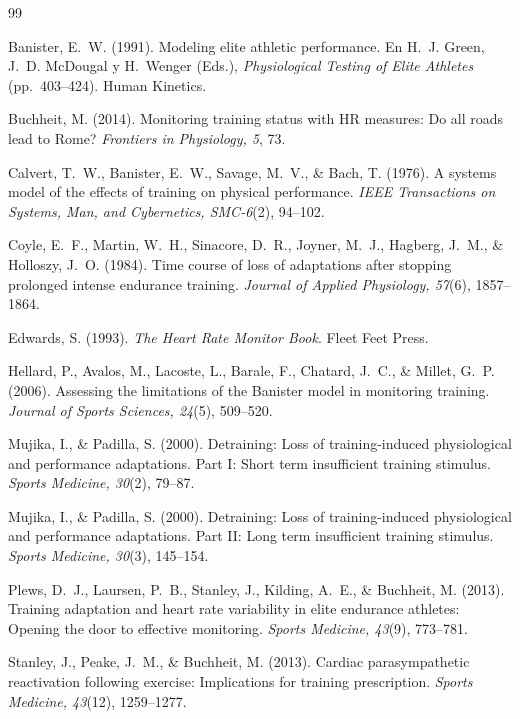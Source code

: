 \documentclass[11pt,a4paper]{article}
\begin{document}
\begin{thebibliography}{99}
\setlength{\itemsep}{2pt}

Banister, E.~W. (1991). Modeling elite athletic performance. En H.~J. Green, J.~D. McDougal y H.~Wenger (Eds.), \textit{Physiological Testing of Elite Athletes} (pp.~403--424). Human Kinetics.

Buchheit, M. (2014). Monitoring training status with HR measures: Do all roads lead to Rome? \textit{Frontiers in Physiology, 5}, 73.

Calvert, T.~W., Banister, E.~W., Savage, M.~V., \& Bach, T. (1976). A systems model of the effects of training on physical performance. \textit{IEEE Transactions on Systems, Man, and Cybernetics, SMC-6}(2), 94--102.

Coyle, E.~F., Martin, W.~H., Sinacore, D.~R., Joyner, M.~J., Hagberg, J.~M., \& Holloszy, J.~O. (1984). Time course of loss of adaptations after stopping prolonged intense endurance training. \textit{Journal of Applied Physiology, 57}(6), 1857--1864.

Edwards, S. (1993). \textit{The Heart Rate Monitor Book}. Fleet Feet Press.

Hellard, P., Avalos, M., Lacoste, L., Barale, F., Chatard, J.~C., \& Millet, G.~P. (2006). Assessing the limitations of the Banister model in monitoring training. \textit{Journal of Sports Sciences, 24}(5), 509--520.

Mujika, I., \& Padilla, S. (2000). Detraining: Loss of training-induced physiological and performance adaptations. Part I: Short term insufficient training stimulus. \textit{Sports Medicine, 30}(2), 79--87.

Mujika, I., \& Padilla, S. (2000). Detraining: Loss of training-induced physiological and performance adaptations. Part II: Long term insufficient training stimulus. \textit{Sports Medicine, 30}(3), 145--154.

Plews, D.~J., Laursen, P.~B., Stanley, J., Kilding, A.~E., \& Buchheit, M. (2013). Training adaptation and heart rate variability in elite endurance athletes: Opening the door to effective monitoring. \textit{Sports Medicine, 43}(9), 773--781.

Stanley, J., Peake, J.~M., \& Buchheit, M. (2013). Cardiac parasympathetic reactivation following exercise: Implications for training prescription. \textit{Sports Medicine, 43}(12), 1259--1277.

\end{thebibliography}
\end{document}
